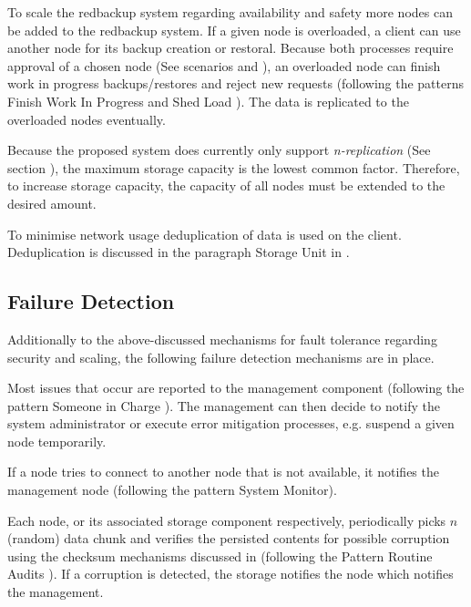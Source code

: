 To scale the redbackup system regarding availability and safety more \glspl{node} can be added to the redbackup system. If a given \gls{node} is overloaded, a \gls{client} can use another \gls{node} for its backup creation or restoral. Because both processes require approval of a chosen \gls{node} (See scenarios  and ), an overloaded \gls{node} can finish work in progress backups/restores and reject new requests (following the patterns Finish Work In Progress and Shed Load \cite{fault-tolerance}). The data is replicated to the overloaded \glspl{node} eventually.

Because the proposed system does currently only support \emph{n-replication} (See section ), the maximum storage capacity is the lowest common factor. Therefore, to increase storage capacity, the capacity of all \glspl{node} must be extended to the desired amount.

To minimise network usage deduplication of data is used on the \gls{client}. Deduplication is  discussed in the paragraph Storage Unit in  .

\subsection{Failure Detection}

Additionally to the above-discussed mechanisms for fault tolerance regarding security and scaling, the following failure detection mechanisms are in place.

Most issues that occur are reported to the \gls{management} component (following the pattern Someone in Charge \cite{fault-tolerance}). The \gls{management} can then decide to notify the system administrator or execute error mitigation processes, e.g. suspend a given \gls{node} temporarily.

If a node tries to connect to another node that is not available, it notifies the management node (following the pattern System Monitor\cite{fault-tolerance}).

Each \gls{node}, or its associated \gls{storage} component respectively, periodically picks $n$ (random) data \gls{chunk} and verifies the persisted contents for possible corruption using the checksum mechanisms discussed in  (following the Pattern Routine Audits \cite{fault-tolerance}). If a corruption is detected, the \gls{storage} notifies the \gls{node} which notifies the \gls{management}.

